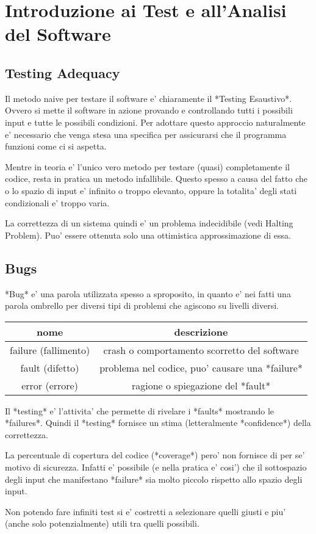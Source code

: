 \chapter{Introduzione ai Test e all'Analisi del Software}

\section{Testing Adequacy}

Il metodo naive per testare il software e' chiaramente il *Testing Esaustivo*.
Ovvero si mette il software in azione provando e controllando tutti i possibili input e tutte le possibili condizioni. 
Per adottare questo approccio naturalmente e' necessario che venga stesa una specifica per assicurarsi che il programma funzioni come ci si aspetta.

Mentre in teoria e' l'unico vero metodo per testare (quasi) completamente il codice, resta in pratica un metodo infallibile.
Questo spesso a causa del fatto che o lo spazio di input e' infinito o troppo elevanto, oppure la totalita' degli stati condizionali e' troppo varia.

La correttezza di un sistema quindi e' un problema indecidibile (vedi Halting Problem). Puo' essere ottenuta solo una ottimistica approssimazione di essa.

\section{Bugs}

*Bug* e' una parola utilizzata spesso a sproposito, in quanto e' nei fatti una parola ombrello per diversi tipi di problemi che agiscono su livelli diversi.

\begin{center}
    \begin{tabular}{|| c c ||}
        \hline
        nome & descrizione \\
        \hline
        failure (fallimento) & crash o comportamento scorretto del software \\
        fault (difetto) & problema nel codice, puo' causare una *failure* \\
        error (errore) & ragione o spiegazione del *fault* \\
        \hline
    \end{tabular}
\end{center}

Il *testing* e' l'attivita' che permette di rivelare i *faults* mostrando le *failures*.
Quindi il *testing* fornisce un stima (letteralmente *confidence*) della correttezza.

La percentuale di copertura del codice (*coverage*) pero' non fornisce di per se' motivo di sicurezza.
Infatti e' possibile (e nella pratica e' cosi') che il sottospazio degli input che manifestano *failure* sia molto piccolo rispetto allo spazio degli input.

Non potendo fare infiniti test si e' costretti a selezionare quelli giusti e piu' (anche solo potenzialmente) utili tra quelli possibili.
